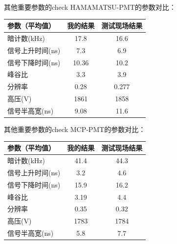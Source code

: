 \documentclass[11pt,compress,xcolor=x11names,UTF8]{beamer}
\begin{document}
\begin{frame}{其他重要参数的check}
HAMAMATSU-PMT的参数对比：

\vspace{.5cm}

\centering
\begin{tabular}{l|c|c}
\hline
\hline
参数（平均值）&  {\color{Blue} 我的结果} & {\color{Blue}测试现场结果} \\\hline
暗计数(kHz)&17.8&16.6\\
信号上升时间(ns)&7.3& 6.9\\
信号下降时间(ns)&10.36& 10.2\\
峰谷比&3.3& 3.9\\
分辨率&0.28& 0.277\\
高压(V)&1861& 1858\\
信号半高宽(ns)&9.08& 11.6\\
\hline
\end{tabular}


\end{frame}
\begin{frame}{其他重要参数的check}
MCP-PMT的参数对比：

\vspace{.5cm}

\centering
\begin{tabular}{l|c|c}
\hline
\hline
参数（平均值）&  {\color{Blue} 我的结果} & {\color{Blue}测试现场结果} \\\hline
暗计数(kHz)&41.4&44.3\\
信号上升时间(ns)&3.2& 4.6\\
信号下降时间(ns)&15.9& 16.2\\
峰谷比&3.19& 4.4\\
分辨率&0.35& 0.32\\
高压(V)&1783& 1784\\
信号半高宽(ns)&5.8& 7.7\\
\hline
\end{tabular}
\end{frame}
\end{document}
